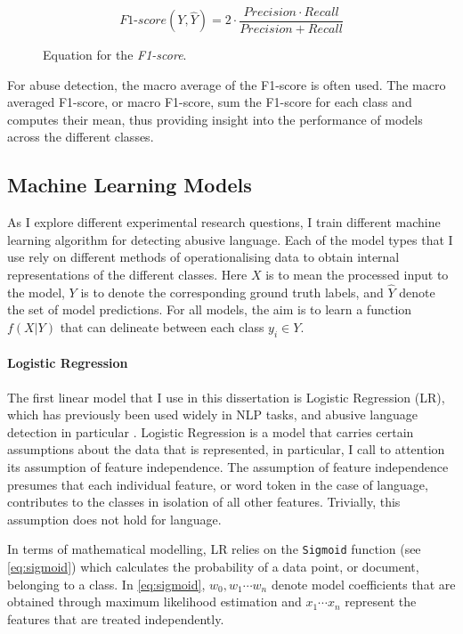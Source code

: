 \begin{figure}[h]
  \begin{equation}\label{eq:f1score}
    \mathit{F1}\text{-}score(Y,\hat{Y}) = 2\cdot\frac{Precision \cdot Recall}{Precision + Recall}
  \end{equation}
  \caption{Equation for the \textit{F1-score}.}
\end{figure}

For abuse detection, the macro average of the F1-score is often used. The macro averaged F1-score, or macro F1-score, sum the F1-score for each class and computes their mean, thus providing insight into the performance of models across the different classes.

\subsection{Machine Learning Models}

As I explore different experimental research questions, I train different machine learning algorithm for detecting abusive language. Each of the model types that I use rely on different methods of operationalising data to obtain internal representations of the different classes. Here $X$ is to mean the processed input to the model, $Y$ is to denote the corresponding ground truth labels, and $\hat{Y}$ denote the set of model predictions. For all models, the aim is to learn a function $f(X|Y)$ that can delineate between each class $y_i\in Y$.

\paragraph{Logistic Regression}
The first linear model that I use in this dissertation is Logistic Regression (LR), which has previously been used widely in NLP tasks, and abusive language detection in particular \citep{LR papers}. Logistic Regression is a model that carries certain assumptions about the data that is represented, in particular, I call to attention its assumption of feature independence. The assumption of feature independence presumes that each individual feature, or word token in the case of language, contributes to the classes in isolation of all other features. Trivially, this assumption does not hold for language.

In terms of mathematical modelling, LR relies on the \texttt{Sigmoid} function (see \ref{eq:sigmoid}) which calculates the probability of a data point, or document, belonging to a class. In \cref{eq:sigmoid}, $w_0, w_1 \cdots w_n$ denote model coefficients that are obtained through maximum likelihood estimation and $x_1 \cdots x_n$ represent the features that are treated independently.


